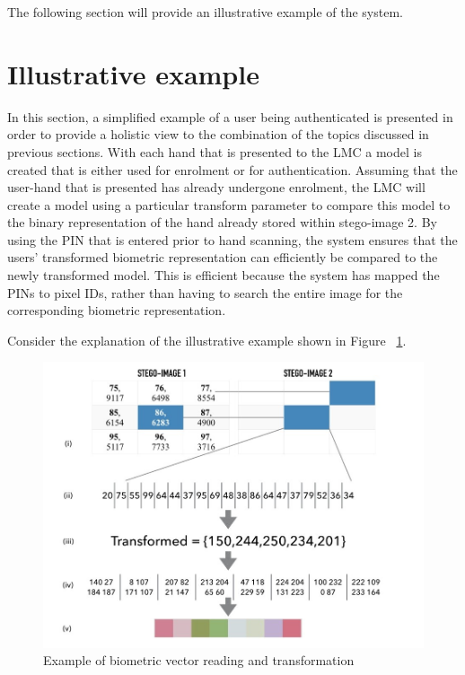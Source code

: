 The following section will provide an illustrative example of the system.

\section{Illustrative example}

In this section, a simplified example of a user being authenticated is presented in order to provide a holistic view to the combination of the topics discussed in previous sections.
With each hand that is presented to the LMC a model is created that is either used for enrolment or for authentication. Assuming that the user-hand that is presented has already undergone enrolment, the LMC will create a model using a particular transform parameter to compare this model to the binary representation of the hand already stored within stego-image 2. By using the PIN that is entered prior to hand scanning, the system ensures that the users’ transformed biometric representation can efficiently be compared to the newly transformed model. This is efficient because the system has mapped the PINs to pixel IDs, rather than having to search the entire image for the corresponding biometric representation.

Consider the explanation of the illustrative example shown in Figure ~\ref{fig:Example of biometric vector reading and transformation}.

    
    \begin{figure}[htbp!] 
    \centering    
    \includegraphics[width=1.0\textwidth]{Chapter3/Figs/Example_of_biometric_vector_reading_and_transformation.jpg}
    \caption[Example of biometric vector reading and transformation]{Example of biometric vector reading and transformation}
    \label{fig:Example of biometric vector reading and transformation}
    \end{figure}

